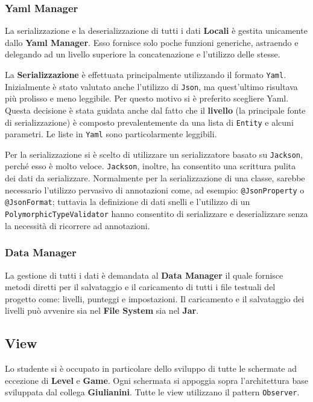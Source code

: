     \subsubsection{Yaml Manager}
    La serializzazione e la deserializzazione di tutti i dati \textbf{Locali} è gestita unicamente dallo \textbf{Yaml Manager}. Esso fornisce solo poche funzioni generiche, astraendo e delegando ad un livello superiore 
    la concatenazione e l'utilizzo delle stesse.
    
    La \textbf{Serializzazione} è effettuata principalmente utilizzando il formato 
    \texttt{Yaml}. Inizialmente è stato valutato anche l'utilizzo di \texttt{Json}, ma quest'ultimo risultava più prolisso e meno leggibile. Per questo motivo si è preferito scegliere Yaml.
    Questa decisione è stata guidata anche dal fatto che il \textbf{livello} (la principale fonte di serializzazione) è composto prevalentemente da una lista di \texttt{Entity} e alcuni parametri. Le liste in  \texttt{Yaml} sono particolarmente leggibili.
    
    Per la serializzazione si è scelto di utilizzare un serializzatore basato su \texttt{Jackson}, perché esso è molto veloce.
    \texttt{Jackson}, inoltre, ha consentito una scrittura pulita dei dati da serializzare.
    Normalmente per la serializzazione di una classe, sarebbe necessario l'utilizzo pervasivo di annotazioni come, ad esempio: \texttt{@JsonProperty} o \texttt{@JsonFormat}; tuttavia la definizione di dati snelli e l'utilizzo di un \texttt{PolymorphicTypeValidator} hanno consentito di serializzare e deserializzare senza la necessità di ricorrere ad annotazioni.
    
    \subsubsection{Data Manager}
    La gestione di tutti i dati è demandata al \textbf{Data Manager}
    il quale fornisce metodi diretti per il salvataggio e il caricamento di tutti i file testuali del progetto come: livelli, punteggi e impostazioni.
    Il caricamento e il salvataggio dei livelli può avvenire sia nel \textbf{File System} sia nel \textbf{Jar}.
    
    
    \subsection{View}
    Lo studente si è occupato in particolare dello sviluppo di tutte le schermate ad eccezione di \textbf{Level} e \textbf{Game}.
    Ogni schermata si appoggia sopra l'architettura base sviluppata dal collega \textbf{Giulianini}. Tutte le view utilizzano il pattern \texttt{Observer}.
    
